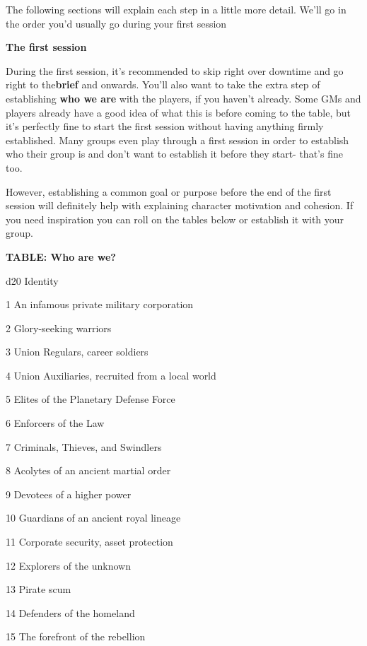 The following sections will explain each step in a little more detail. We’ll go in the order you’d usually go during your first session

\begin{center}
\textbf{The first session}
\end{center}

During the first session, it’s recommended to skip right over downtime and go right to the\textbf{brief} and onwards. You’ll also want to take the extra step of establishing \textbf{who we are} with the players, if you haven’t already. Some GMs and players already have a good idea of what this is before coming to the table, but it’s perfectly fine to start the first session without having anything firmly established. Many groups even play through a first session in order to establish who their group is and don’t want to establish it before they start- that’s fine too.

However, establishing a common goal or purpose before the end of the first session will definitely help with explaining character motivation and cohesion. If you need inspiration you can roll on the tables below or establish it with your group.

\textbf{TABLE: Who are we?}

 d20       Identity

 1         An infamous private military corporation

 2         Glory-seeking warriors

 3         Union Regulars, career soldiers

 4         Union Auxiliaries, recruited from a local world

 5         Elites of the Planetary Defense Force

 6         Enforcers of the Law

 7         Criminals, Thieves, and Swindlers

 8         Acolytes of an ancient martial order

 9         Devotees of a higher power

  10       Guardians of an ancient royal lineage

  11       Corporate security, asset protection

  12       Explorers of the unknown

  13       Pirate scum

  14       Defenders of the homeland

  15       The forefront of the rebellion

